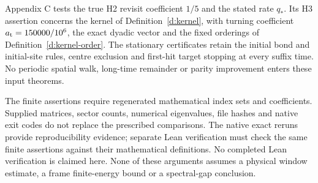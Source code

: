 Appendix C tests the true H2 revisit coefficient \(1/5\) and
the stated rate \(q_*\). Its H3 assertion concerns the kernel of
Definition~\ref{d:kernel}, with turning coefficient
\(a_{\rm t}=150000/10^6\), the exact dyadic vector and the
fixed orderings of Definition~\ref{d:kernel-order}. The stationary
certificates retain the initial bond and initial-site rules,
centre exclusion and first-hit target stopping at every suffix
time. No periodic spatial walk, long-time remainder or parity
improvement enters these input theorems.

The finite assertions require regenerated mathematical index sets
and coefficients. Supplied matrices, sector counts, numerical
eigenvalues, file hashes and native exit codes do not replace
the prescribed comparisons. The native exact reruns provide
reproducibility evidence; separate Lean verification must check
the same finite assertions against their mathematical definitions.
No completed Lean verification is claimed here. None of these
arguments assumes a physical window estimate, a frame finite-energy
bound or a spectral-gap conclusion.
